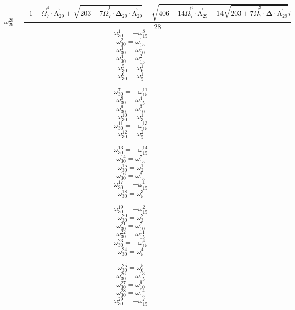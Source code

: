 \documentclass{article}
\begin{document}
\[ \omega_{29}^{28}=\frac{-1+\vec{\Omega}_{7}^{4}\cdot\vec{\mathrm{A}}_{29}+\sqrt{203+7\vec{\Omega}_{7}^{1}\cdot\boldsymbol{\Delta}_{29}\cdot\vec{\mathrm{A}}_{29}}-\sqrt{406-14\vec{\Omega}_{7}^{6}\cdot\vec{\mathrm{A}}_{29}-14\sqrt{203+7\vec{\Omega}_{7}^{3}\cdot\boldsymbol{\Delta}\cdot\vec{\mathrm{A}}_{29}}}i}{28} \]
\[ \omega_{30}^{1}=-\omega_{15}^{8} \]
\[ \omega_{30}^{2}=\omega_{15}^{1} \]
\[ \omega_{30}^{3}=\omega_{10}^{1} \]
\[ \omega_{30}^{4}=\omega_{15}^{2} \]
\[ \omega_{30}^{5}=\omega_{6}^{1} \]
\[ \omega_{30}^{6}=\omega_{5}^{1} \]

\[ \omega_{30}^{7}=-\omega_{15}^{11} \]
\[ \omega_{30}^{8}=\omega_{15}^{4} \]
\[ \omega_{30}^{9}=\omega_{10}^{3} \]
\[ \omega_{30}^{10}=\omega_{3}^{1} \]
\[ \omega_{30}^{11}=-\omega_{15}^{13} \]
\[ \omega_{30}^{12}=\omega_{5}^{2} \]

\[ \omega_{30}^{13}=-\omega_{15}^{14} \]
\[ \omega_{30}^{14}=\omega_{15}^{7} \]
\[ \omega_{30}^{15}=\omega_{2}^{1} \]
\[ \omega_{30}^{16}=\omega_{15}^{8} \]
\[ \omega_{30}^{17}=-\omega_{15}^{1} \]
\[ \omega_{30}^{18}=\omega_{5}^{3} \]

\[ \omega_{30}^{19}=-\omega_{15}^{2} \]
\[ \omega_{30}^{20}=\omega_{3}^{2} \]
\[ \omega_{30}^{21}=\omega_{10}^{7} \]
\[ \omega_{30}^{22}=\omega_{15}^{11} \]
\[ \omega_{30}^{23}=-\omega_{15}^{4} \]
\[ \omega_{30}^{24}=\omega_{5}^{4} \]

\[ \omega_{30}^{25}=\omega_{6}^{5} \]
\[ \omega_{30}^{26}=\omega_{15}^{13} \]
\[ \omega_{30}^{27}=\omega_{10}^{9} \]
\[ \omega_{30}^{28}=\omega_{15}^{14} \]
\[ \omega_{30}^{29}=-\omega_{15}^{7} \]
\end{document}
